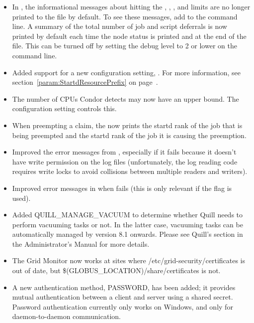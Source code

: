 \begin{itemize}
\item In , the informational messages about hitting
the , , , and 
limits are no longer printed to the  file by default.
To see these messages, add  to the 
command line.  A summary of the total number of job and script deferrals
is now printed by default each time the node status is printed and at
the end of the  file.  This can be turned off by
setting the debug level to 2 or lower on the  
command line.

\item Added support for a new configuration setting,
  .
  For more information, see section~\ref{param:StartdResourcePrefix}
  on page~\pageref{param:StartdResourcePrefix}.

\item The number of CPUs Condor detects may now have an upper bound.
  The  configuration setting controls this.

\item When preempting a claim, the  now prints the 
startd rank of the job that is being preempted and the startd rank of the 
job it is causing the preemption.

\item Improved the error messages from ,
especially if it fails because it doesn't have write permission
on the log files (unfortunately, the log reading code requires write
locks to avoid collisions between multiple readers and writers).

\item Improved error messages in  when 
fails (this is only relevant if the  flag is used).

\item Added QUILL\_MANAGE\_VACUUM to determine whether Quill needs to 
perform vacuuming tasks or not. In the latter case, 
vacuuming tasks can be automatically managed by  
version 8.1 onwards. Please see Quill's section in the Administrator's 
Manual for more details.

\item The Grid Monitor now works at sites where
/etc/grid-security/certificates is out of date, but
\$(GLOBUS\_LOCATION)/share/certificates is not.

\item A new authentication method, PASSWORD, has been added; it
provides mutual authentication between a client and server using a
shared secret. Password authentication currently only works on
Windows, and only for daemon-to-daemon communication.


\end{itemize}
